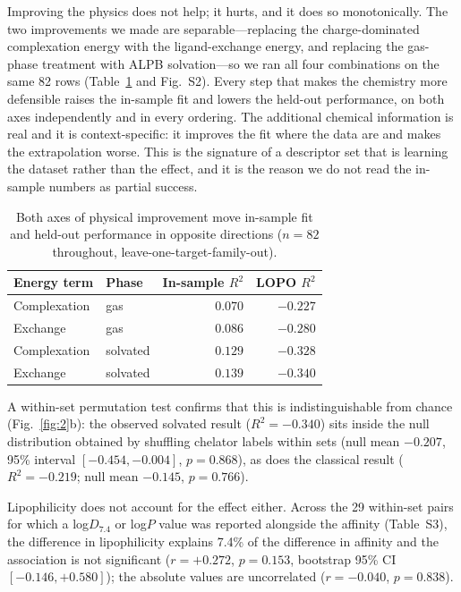 Improving the physics does not help; it hurts, and it does so monotonically. The two improvements we made are separable---replacing the charge-dominated complexation energy with the ligand-exchange energy, and replacing the gas-phase treatment with ALPB solvation---so we ran all four combinations on the same 82 rows (Table~\ref{tab:ladder} and Fig.~S2). Every step that makes the chemistry more defensible raises the in-sample fit and lowers the held-out performance, on both axes independently and in every ordering. The additional chemical information is real and it is context-specific: it improves the fit where the data are and makes the extrapolation worse. This is the signature of a descriptor set that is learning the dataset rather than the effect, and it is the reason we do not read the in-sample numbers as partial success.

\begin{table}[h]
\small
\caption{Both axes of physical improvement move in-sample fit and held-out performance in opposite directions ($n = 82$ throughout, leave-one-target-family-out).}
\label{tab:ladder}
\begin{tabular*}{\columnwidth}{@{\extracolsep{\fill}}llrr}
\toprule
Energy term & Phase & In-sample $R^2$ & LOPO $R^2$ \\
\midrule
Complexation & gas       & $0.070$ & $-0.227$ \\
Exchange     & gas       & $0.086$ & $-0.280$ \\
Complexation & solvated  & $0.129$ & $-0.328$ \\
Exchange     & solvated  & $0.139$ & $-0.340$ \\
\bottomrule
\end{tabular*}
\end{table}

A within-set permutation test confirms that this is indistinguishable from chance (Fig.~\ref{fig:2}b): the observed solvated result ($R^2 = -0.340$) sits inside the null distribution obtained by shuffling chelator labels within sets (null mean $-0.207$, 95\% interval $[-0.454, -0.004]$, $p = 0.868$), as does the classical result ($R^2 = -0.219$; null mean $-0.145$, $p = 0.766$).

Lipophilicity does not account for the effect either. Across the 29 within-set pairs for which a log$D_{7.4}$ or log$P$ value was reported alongside the affinity (Table~S3), the difference in lipophilicity explains 7.4\% of the difference in affinity and the association is not significant ($r = +0.272$, $p = 0.153$, bootstrap 95\% CI $[-0.146, +0.580]$); the absolute values are uncorrelated ($r = -0.040$, $p = 0.838$).

